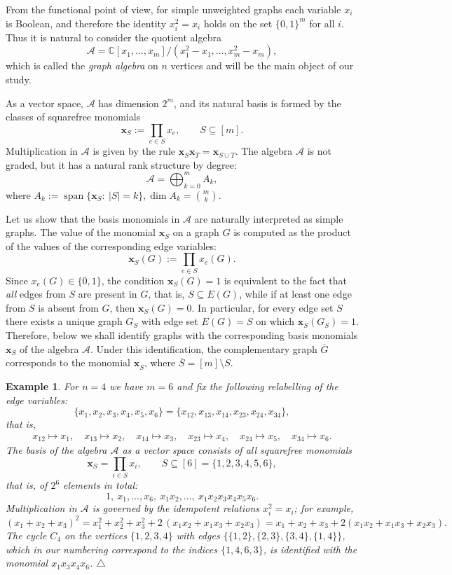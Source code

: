 \documentclass[12pt,reqno]{amsart}
\newtheorem{example}{Example}[section]
\begin{document}
From the functional point of view, for simple unweighted graphs each variable
$x_i$ is Boolean, and therefore the identity $x_i^2=x_i$ holds on the set
$\{0,1\}^m$ for all $i$.
Thus it is natural to consider the quotient algebra
$$
\mathcal A=\mathbb{C}[x_1,\dots,x_m]/(x_1^2-x_1,\dots,x_m^2-x_m),
$$
which is called the \emph{graph algebra} on $n$ vertices and will be the main
object of our study.

As a vector space, $\mathcal A$ has dimension $2^m$, and its natural basis is
formed by the classes of squarefree monomials
$$
\boldsymbol{x}_S:=\prod_{e\in S}x_e,\qquad S\subseteq [m].
$$
Multiplication in $\mathcal A$ is given by the rule
$
\boldsymbol{x}_S \boldsymbol{x}_T=\boldsymbol{x}_{S\cup T}.
$
The algebra $\mathcal A$ is not graded, but it has a natural rank structure by
degree:
$$
\mathcal A=\bigoplus_{k=0}^m A_k,
$$
where
$
A_k:=\operatorname{span}\{\boldsymbol{x}_S:\ |S|=k\}, \dim A_k=\binom{m}{k}.
$

\medskip
Let us show that the basis monomials in $\mathcal A$ are naturally
interpreted as simple graphs.
The value of the monomial $\boldsymbol{x}_S$ on a graph $G$ is computed as the
product of the values of the corresponding edge variables:
$$
\boldsymbol{x}_S(G):=\prod_{e\in S} x_e(G).
$$
Since $x_e(G)\in\{0,1\}$, the condition $\boldsymbol{x}_S(G)=1$ is equivalent
to the fact that \emph{all} edges from $S$ are present in $G$, that is,
$S\subseteq E(G)$, while if at least one edge from $S$ is absent from $G$, then
$\boldsymbol{x}_S(G)=0$.
In particular, for every edge set $S$ there exists a unique graph $G_S$ with
edge set $E(G)=S$ on which $\boldsymbol{x}_S(G_S)=1$.
Therefore, below we shall identify graphs with the corresponding basis
monomials $\boldsymbol{x}_S$ of the algebra $\mathcal A$.
Under this identification, the complementary graph $\overline{G}$ corresponds
to the monomial $\boldsymbol{x}_{\overline{S}}$, where
$\overline{S}=[m]\setminus S$.

\begin{example}\rm
For $n=4$ we have $m=6$ and fix the following relabelling of the edge
variables:
$$
\{x_1,x_2,x_3,x_4,x_5,x_6\}
=\{x_{12},x_{13},x_{14},x_{23},x_{24},x_{34}\},
$$
that is,
\begin{gather}\label{perepoz}
x_{12}\mapsto x_1,\quad x_{13}\mapsto x_2,\quad x_{14}\mapsto x_3,\quad
x_{23}\mapsto x_4,\quad x_{24}\mapsto x_5,\quad x_{34}\mapsto x_6.
\end{gather}
The basis of the algebra $\mathcal A$ as a vector space consists of all
squarefree monomials
$$
\boldsymbol{x}_S=\prod_{i\in S}x_i,\qquad S\subseteq [6]=\{1,2,3,4,5,6\},
$$
that is, of $2^6$ elements in total:
$$
1,\ x_1,\ldots,x_6,\ x_1x_2,\ldots,\ x_1x_2x_3x_4x_5x_6.
$$
Multiplication in $\mathcal A$ is governed by the idempotent relations
$x_i^2=x_i$; for example,
$$
(x_1+x_2+x_3)^2
=x_1^2+x_2^2+x_3^2+2\,(x_1 x_2+x_1 x_3+x_2 x_3)
=
x_1+x_2+x_3+2(x_1 x_2+x_1 x_3+x_2 x_3).
$$
The cycle $C_4$ on the vertices $\{1,2,3,4\}$ with edges
$\{\{1,2\},\{2,3\},\{3,4\},\{1,4\}\}$, which in our numbering correspond
to the indices $\{1,4,6,3\}$, is identified with the monomial
$x_1x_3x_4x_6$.
$\triangle$ \end{example}
\end{document}
